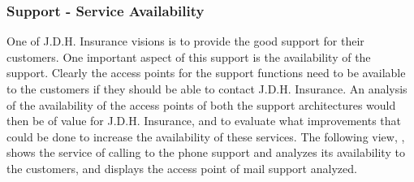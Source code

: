 \subsubsection{Support - Service Availability}
\label{sec:support_analysis}
One of J.D.H. Insurance visions is to provide the good support for their customers. One important aspect of this support is the availability of the support. Clearly the access points for the support functions need to be available to the customers if they should be able to contact J.D.H. Insurance. An analysis of the availability of the access points of both the support architectures would then be of value for J.D.H. Insurance, and to evaluate what improvements that could be done to increase the availability of these services. The following view, , shows the service of calling to the phone support and analyzes its availability to the customers, and  displays the access point of mail support analyzed.
